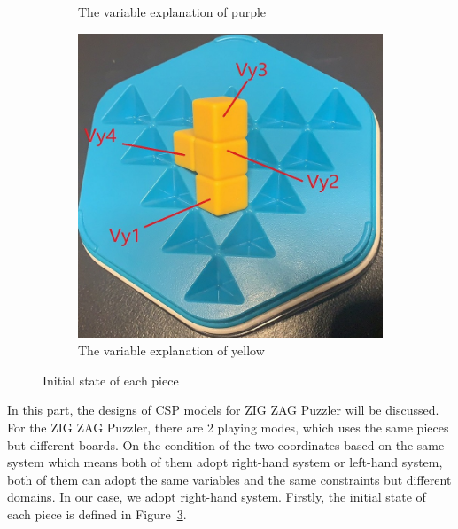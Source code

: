 \begin{figure}[htbp]
\begin{subfigure}[b]{0.25\textwidth}
\caption{The variable explanation of purple}
  \label{fig:3Dpurple}
\end{subfigure}
\begin{subfigure}[b]{0.25\textwidth}
\centering
\includegraphics[width=\textwidth]{figs/3Dyellow.jpg}
\caption{The variable explanation of yellow}
  \label{fig:3Dyellow}
\end{subfigure}
\caption{Initial state of each piece}
  \label{fig:all3Dinit}
\end{figure}
In this part, the designs of CSP models for ZIG ZAG Puzzler will be discussed. For the ZIG ZAG Puzzler, there are 2 playing modes, which uses the same pieces but different boards. On the condition of the two coordinates based on the same system which means both of them adopt right-hand system or left-hand system, both of them can adopt the same variables and the same constraints but different domains. In our case, we adopt right-hand system. Firstly, the initial state of each piece is defined in Figure~\ref{fig:all3Dinit}.
